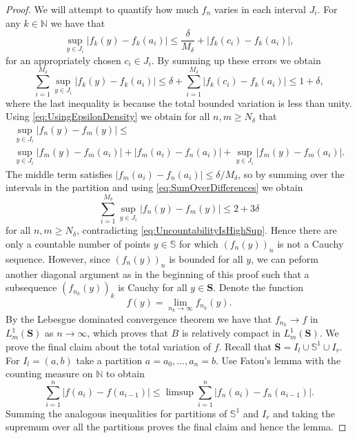 \documentclass[pdftex,11pt,a4paper,oneside]{article}
\theoremstyle{plain}
\begin{document}
\begin{proof}
 We will attempt to quantify how much $f_n$ varies in each interval $J_i$. For any $k\in\mathbb{N}$ we have that
\[\sup_{y\in J_i}|f_k(y)-f_k(a_i)| \leq \frac{\delta}{M_\delta} +|f_k(c_i)-f_k(a_i)|,\]
for an appropriately chosen $c_i\in J_i$. By summing up these errors we obtain 
\begin{equation}\label{eq:SumOverDifferences}
    \sum_{i=1}^{M_\delta}\sup_{y\in J_i}|f_k(y)-f_k(a_i)|\leq \delta +\sum_{i=1}^{M_\delta} |f_k(c_i)-f_k(a_i)|\leq 1+\delta,
\end{equation}
where the last inequality is because the total bounded variation is less than unity. Using \eqref{eq:UsingEpsilonDensity} we obtain for all $n,m\geq N_\delta$ that
\begin{equation*}
\begin{split}
        \sup_{y\in J_i}|f_n(y)-f_m(y)|\leq \\
    \sup_{y\in J_i}|f_m(y)-f_m(a_i)|+|f_m(a_i)-f_n(a_i)|+\sup_{y\in J_i}|f_m(y)-f_m(a_i)|.
\end{split}
    \end{equation*}
The middle term satisfies $|f_m(a_i)-f_n(a_i)|\leq \delta/M_\delta$, so by summing over the intervals in the partition and using \eqref{eq:SumOverDifferences} we obtain
\[\sum_{i=1}^{M_\delta}\sup_{y\in J_i}|f_n(y)-f_m(y)|\leq 2+3\delta\]
for all $n,m\geq N_\delta$, contradicting \eqref{eq:UncountabilityIsHighSup}. Hence there are only a countable number of points $y\in\mathbb{S}$ for which $(f_n(y))_n$ is not a Cauchy sequence. However, since $(f_n(y))_n$ is bounded for all $y$, we can peform another diagonal argument as in the beginning of this proof such that a subsequence $(f_{n_k}(y))_k$ is Cauchy for all $y\in\mathbf{S}$. Denote the function 
\[f(y) = \lim_{n_k\to\infty} f_{n_k}(y).\]
By the Lebesgue dominated convergence theorem we have that $f_{n_k}\to f$ in  $L^1_m(\mathbf{S})$ as $n\to \infty$, which proves that $B$ is relatively compact in  $L^1_m(\mathbf{S})$. We prove the final claim about the total variation of $f$. Recall that $\mathbf{S} =I_l\cup \mathbb{S}^1\cup I_r $. For $I_l = (a,b)$ take a partition $a=a_0,\ldots,a_n = b$. Use Fatou's lemma with the counting measure on $\mathbb{N}$ to obtain
\[\sum_{i=1}^n|f(a_i)-f(a_{i-1})|\leq \limsup \sum_{i=1}^n|f_n(a_i)-f_n(a_{i-1})|.\]
Summing the analogous inequalities for partitions of $\mathbb{S}^1$ and $I_r$ and taking the supremum over all the partitions proves the final claim and hence the lemma. 




\end{proof}
\end{document}
